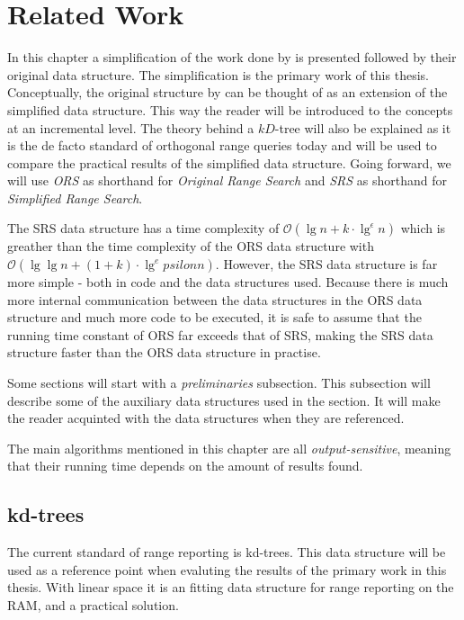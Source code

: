 \chapter{Related Work}
\label{ch:relatedwork}


In this chapter a simplification of the work done by \citet{chanetal} is presented followed by their original data structure. The simplification is the primary work of this thesis. Conceptually, the original structure by \citet{chanetal} can be thought of as an extension of the simplified data structure. This way the reader will be introduced to the concepts at an incremental level. The theory behind a $kD$-tree will also be explained as it is the de facto standard of orthogonal range queries today and will be used to compare the practical results of the simplified data structure.  Going forward, we will use \emph{ORS} as shorthand for \emph{Original Range Search} and \emph{SRS} as shorthand for \emph{Simplified Range Search}.

The SRS data structure has a time complexity of $\mathcal{O}(\lg n + k\cdot \lg^\epsilon n)$ which is greather than the time complexity of the ORS data structure with $\mathcal{O}(\lg \lg n + (1+k)\cdot \lg^epsilon n)$. However, the SRS data structure is far more simple - both in code and the data structures used. Because there is much more internal communication between the data structures in  the ORS data structure and much more code to be executed, it is safe to assume that the running time constant of ORS far exceeds that of SRS, making the SRS data structure faster than the ORS data structure in practise. 

Some sections will start with a \emph{preliminaries} subsection. This subsection will describe some of the auxiliary data structures used in the section.  It will make the reader acquinted with the data structures when they are referenced.

The main algorithms mentioned in this chapter are all \emph{output-sensitive}, meaning that their running time depends on the amount of results found.

\section{kd-trees}

The current standard of range reporting is kd-trees. This data structure will be used as a reference point when evaluting the results of the primary work in this thesis. With linear space it is an fitting data structure for range reporting on the RAM, and a practical solution.


